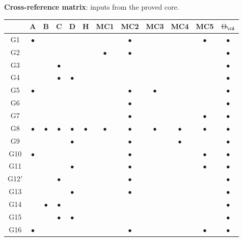 \medskip

\noindent\textbf{Cross-reference matrix}: inputs from the proved core.

\begin{center}
\renewcommand{\arraystretch}{1.3}
\small
\begin{tabular}{c|ccccc|ccccc|c}
& \textbf{A} & \textbf{B} & \textbf{C} & \textbf{D} & \textbf{H}
& \textbf{MC1} & \textbf{MC2} & \textbf{MC3} & \textbf{MC4} & \textbf{MC5}
& $\Theta_\cA$ \\
\hline
G1 & $\bullet$ & & & & & & $\bullet$ & & & $\bullet$ & $\bullet$ \\
G2 & & & & & & $\bullet$ & $\bullet$ & & & & $\bullet$ \\
G3 & & & $\bullet$ & & & & & & & & $\bullet$ \\
G4 & & & $\bullet$ & $\bullet$ & & & & & & & $\bullet$ \\
G5 & $\bullet$ & & & & & & $\bullet$ & $\bullet$ & & & $\bullet$ \\
G6 & & & & & & & $\bullet$ & & & & $\bullet$ \\
G7 & & & & & & & $\bullet$ & & & $\bullet$ & $\bullet$ \\
G8 & $\bullet$ & $\bullet$ & $\bullet$ & $\bullet$ & $\bullet$
 & $\bullet$ & $\bullet$ & $\bullet$ & $\bullet$ & $\bullet$
 & $\bullet$ \\
G9 & & & & $\bullet$ & & & $\bullet$ & & $\bullet$ & & $\bullet$ \\
G10 & $\bullet$ & & & & & & $\bullet$ & & & $\bullet$ & $\bullet$ \\
\hline
G11 & & & & $\bullet$ & & & $\bullet$ & & & $\bullet$ & $\bullet$ \\
G12$'$ & & & $\bullet$ & & & & $\bullet$ & & & & $\bullet$ \\
G13 & & & & $\bullet$ & & & $\bullet$ & & & & $\bullet$ \\
G14 & & $\bullet$ & $\bullet$ & & & & & & & & $\bullet$ \\
G15 & & & $\bullet$ & $\bullet$ & & & & & & & $\bullet$ \\
G16 & $\bullet$ & & & & & & $\bullet$ & & & $\bullet$ & $\bullet$
\end{tabular}
\end{center}
